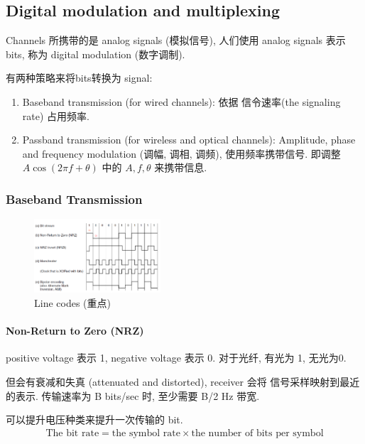 \subsection{Digital modulation and multiplexing}
Channels 所携带的是 analog signals (模拟信号), 人们使用 analog signals 表示 bits, 称为 digital modulation (数字调制). 

有两种策略来将bits转换为 signal:
\begin{enumerate}\small
    \item Baseband transmission (for wired channels): 依据 信令速率(the signaling rate) 占用频率. 
    \item Passband transmission (for wireless and optical channels): Amplitude, phase and frequency modulation (调幅, 调相, 调频), 使用频率携带信号. 即调整 $A\cos (2\pi f+\theta)$ 中的 $A, f, \theta$ 来携带信息. 
\end{enumerate}

\subsubsection{Baseband Transmission}
\begin{figure}[!htb]
    \centering
    \includegraphics[width=0.42\textwidth]{pic/CN2/Line codes.png}
    \caption{Line codes (重点)}
\end{figure}

\paragraph{Non-Return to Zero (NRZ)} positive voltage 表示 1, negative voltage 表示 0. 对于光纤, 有光为 1, 无光为0. 

但会有衰减和失真 (attenuated and distorted), receiver 会将 信号采样映射到最近的表示. 传输速率为 B bits/sec 时, 至少需要 B/2 Hz 带宽. 

可以提升电压种类来提升一次传输的 bit. 
{\small
\begin{align*}
    \text{The bit rate} = \text{the symbol rate} \times \text{the number of bits per symbol}
\end{align*}}

